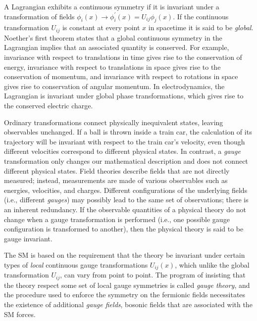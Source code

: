 A Lagrangian exhibits a continuous symmetry if it is invariant under a
transformation of fields $\phi_i(x) \rightarrow \phi_i^\prime(x) = U_{ij}
\phi_j(x)$. If the continuous transformation $U_{ij}$ is constant at every point
$x$ in spacetime it is said to be \textit{global}. Noether's first theorem
states that a global continuous symmetry in the Lagrangian implies that an
associated quantity is conserved. For example, invariance with respect to
translations in time gives rise to the conservation of energy, invariance with
respect to translations in space gives rise to the conservation of momentum, and
invariance with respect to rotations in space gives rise to conservation of
angular momentum. In electrodynamics, the Lagrangian is invariant under global
phase transformations, which gives rise to the conserved electric charge.

Ordinary transformations connect physically inequivalent states, leaving
observables unchanged. If a ball is thrown inside a train car, the calculation
of its trajectory will be invariant with respect to the train car's velocity,
even though different velocities correspond to different physical states. In
contrast, a \textit{gauge} transformation only changes our mathematical
description and does not connect different physical states. Field theories
describe fields that are not directly measured; instead, measurements are made
of various observables such as energies, velocities, and charges. Different
configurations of the underlying fields (i.e., different \textit{gauges}) may
possibly lead to the same set of observations; there is an inherent redundancy.
If the observable quantities of a physical theory do not change when a gauge
transformation is performed (i.e., one possible gauge configuration is
transformed to another), then the physical theory is said to be gauge invariant.

The SM is based on the requirement that the theory be invariant under certain
types of \textit{local} continuous gauge transformations $U_{ij}(x)$, which
unlike the global transformation $U_{ij}$, can vary from point to point. The
program of insisting that the theory respect some set of local gauge symmetries
is called \textit{gauge theory}, and the procedure used to enforce the symmetry
on the fermionic fields necessitates the existence of additional \textit{gauge
fields}, bosonic fields that are associated with the SM forces.

